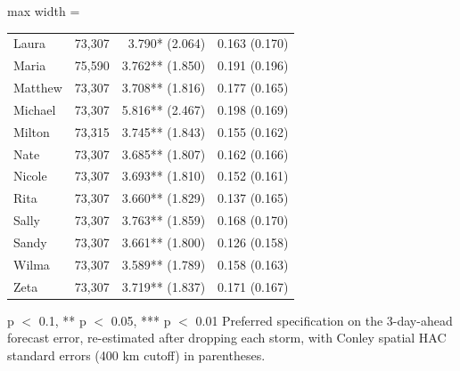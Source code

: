 \begin{table}
\begin{adjustbox}{max width = \textwidth}
\begin{threeparttable}
\begin{tabular}[t]{>{\raggedright\arraybackslash}p{3cm}rrr}
Laura & 73,307 & 3.790* (2.064) & 0.163 (0.170)\\
Maria & 75,590 & 3.762** (1.850) & 0.191 (0.196)\\
Matthew & 73,307 & 3.708** (1.816) & 0.177 (0.165)\\
Michael & 73,307 & 5.816** (2.467) & 0.198 (0.169)\\
Milton & 73,315 & 3.745** (1.843) & 0.155 (0.162)\\
Nate & 73,307 & 3.685** (1.807) & 0.162 (0.166)\\
Nicole & 73,307 & 3.693** (1.810) & 0.152 (0.161)\\
Rita & 73,307 & 3.660** (1.829) & 0.137 (0.165)\\
Sally & 73,307 & 3.763** (1.859) & 0.168 (0.170)\\
Sandy & 73,307 & 3.661** (1.800) & 0.126 (0.158)\\
Wilma & 73,307 & 3.589** (1.789) & 0.158 (0.163)\\
Zeta & 73,307 & 3.719** (1.837) & 0.171 (0.167)\\
\bottomrule
\end{tabular}
\begin{tablenotes}
\small
\item * p $<$ 0.1, ** p $<$ 0.05, *** p $<$ 0.01 Preferred specification on the 3-day-ahead forecast error, re-estimated after dropping each storm, with Conley spatial HAC standard errors (400 km cutoff) in parentheses.
\end{tablenotes}
\end{threeparttable}
\end{adjustbox}
\end{table}
